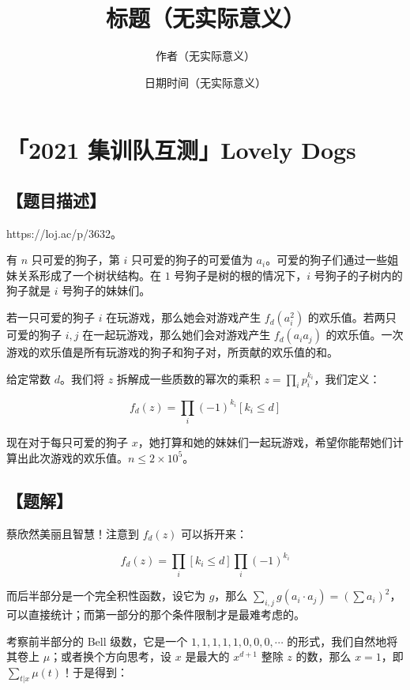 \documentclass[UTF8,12pt,a4paper]{ctexart}
\title{标题（无实际意义）}
\author{作者（无实际意义）}
\date{日期时间（无实际意义）}
\begin{document}
	\fontsize{12pt}{12pt}\selectfont
	
	\newpage
	\pagestyle{fancy}
	
	
	
	\section*{「2021 集训队互测」Lovely Dogs}
	
	\subsection*{【题目描述】}
	
	https://loj.ac/p/3632。
	
	有 $n$ 只可爱的狗子，第 $i$ 只可爱的狗子的可爱值为 $a_i$。可爱的狗子们通过一些姐妹关系形成了一个树状结构。在 $1$ 号狗子是树的根的情况下，$i$ 号狗子的子树内的狗子就是 $i$ 号狗子的妹妹们。
	
	若一只可爱的狗子 $i$ 在玩游戏，那么她会对游戏产生 $f_d(a_i^2)$ 的欢乐值。若两只可爱的狗子 $i,j$ 在一起玩游戏，那么她们会对游戏产生 $f_d(a_ia_j)$ 的欢乐值。一次游戏的欢乐值是所有玩游戏的狗子和狗子对，所贡献的欢乐值的和。
	
	给定常数 $d$。我们将 $z$ 拆解成一些质数的幂次的乘积 $z=\prod_ip_i^{k_i}$，我们定义：
	
	$$
	f_d(z)=\prod_i(-1)^{k_i}[k_i\le d]
	$$
	
	现在对于每只可爱的狗子 $x$，她打算和她的妹妹们一起玩游戏，希望你能帮她们计算出此次游戏的欢乐值。$n\le 2\times 10^5$。
	
	\subsection*{【题解】}
	
	蔡欣然美丽且智慧！注意到 $f_d(z)$ 可以拆开来：
	
	$$
	f_d(z) = \prod_i [k_i\le d] \prod_i (-1)^{k_i}
	$$
	
	而后半部分是一个完全积性函数，设它为 $g$，那么 $\sum_{i,j} g(a_i\cdot a_j)=\left(\sum a_i\right)^2$，可以直接统计；而第一部分的那个条件限制才是最难考虑的。
	
	考察前半部分的 Bell 级数，它是一个 $1,1,1,1,1,0,0,0,\cdots$ 的形式，我们自然地将其卷上 $\mu$；或者换个方向思考，设 $x$ 是最大的 $x^{d+1}$ 整除 $z$ 的数，那么 $x=1$，即 $\sum_{t|x} \mu(t)$！于是得到：
	
\end{document}
